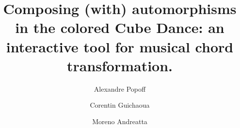 \documentclass[10pt]{amsart}
\begin{document}
\newcommand{\autdiagramnegative}[8] {
\scalebox{0.6}{
\begin{tikzpicture}[scale=1.0]
\node (Aug0_top) at (0,0) {$C_{\text{aug}}$};
\node (Aug3_top) at (1,0) {$G_{\text{aug}}$};
\node (Aug6_top) at (2,0) {$D_{\text{aug}}$};
\node (Aug9_top) at (3,0) {$F_{\text{aug}}$};

\node (Aug0_bottom) at (0,-2.5) {$C_{\text{aug}}$};
\node (Aug3_bottom) at (1,-2.5) {$G_{\text{aug}}$};
\node (Aug6_bottom) at (2,-2.5) {$D_{\text{aug}}$};
\node (Aug9_bottom) at (3,-2.5) {$F_{\text{aug}}$};

\draw[-,>=latex, line width=1.0] (Aug0_top) to [in=90,out=270] (Aug#1_bottom) ;
\draw[-,>=latex, line width=1.0] (Aug3_top) to [in=90,out=270] (Aug#2_bottom) ;
\draw[-,>=latex, line width=1.0] (Aug6_top) to [in=90,out=270] (Aug#3_bottom) ;
\draw[-,>=latex, line width=1.0] (Aug9_top) to [in=90,out=270] (Aug#4_bottom) ;

\node (Top_0) at (5,0) {$\overline{C_M}$};
\node (Top_3) at (6,0) {$\overline{G_M}$};
\node (Top_6) at (7,0) {$\overline{D_M}$};
\node (Top_9) at (8,0) {$\overline{F_M}$};

\node (Bottom_0) at (5,-2.5) {$\overline{C_m}$};
\node (Bottom_3) at (6,-2.5) {$\overline{G_m}$};
\node (Bottom_6) at (7,-2.5) {$\overline{D_m}$};
\node (Bottom_9) at (8,-2.5) {$\overline{F_m}$};

\draw[-,>=latex, line width=1.0] (Top_0) to [in=90,out=270] node [midway,fill=white,text=blue,pos=0.85]  {$g_0$} (Bottom_#5)  ;
\draw[-,>=latex, line width=1.0] (Top_3) to [in=90,out=270] node [midway,fill=white,text=blue,pos=0.85]  {$g_1$} (Bottom_#6) ;
\draw[-,>=latex, line width=1.0] (Top_6) to [in=90,out=270] node [midway,fill=white,text=blue,pos=0.85]  {$g_2$} (Bottom_#7) ;
\draw[-,>=latex, line width=1.0] (Top_9) to [in=90,out=270] node [midway,fill=white,text=blue,pos=0.85]  {$g_3$} (Bottom_#8) ;
\end{tikzpicture}
}
}


\title[Composing (with) automorphisms in the colored Cube Dance]{Composing (with) automorphisms in the colored Cube Dance: an interactive tool for musical chord transformation.}
\author{Alexandre Popoff}
\address{Independent Researcher}

\author{Corentin Guichaoua}
\address{STMS (UMR9912), CNRS, Ircam, Sorbonne Universit\'e, Minist\`ere de la Culture, Paris, France}

\author{Moreno Andreatta}
\address{CNRS/Institute for Advanced Mathematical Research, ITI CREAA, University of Strasbourg, France and IRCAM, Paris, France}
\end{document}
